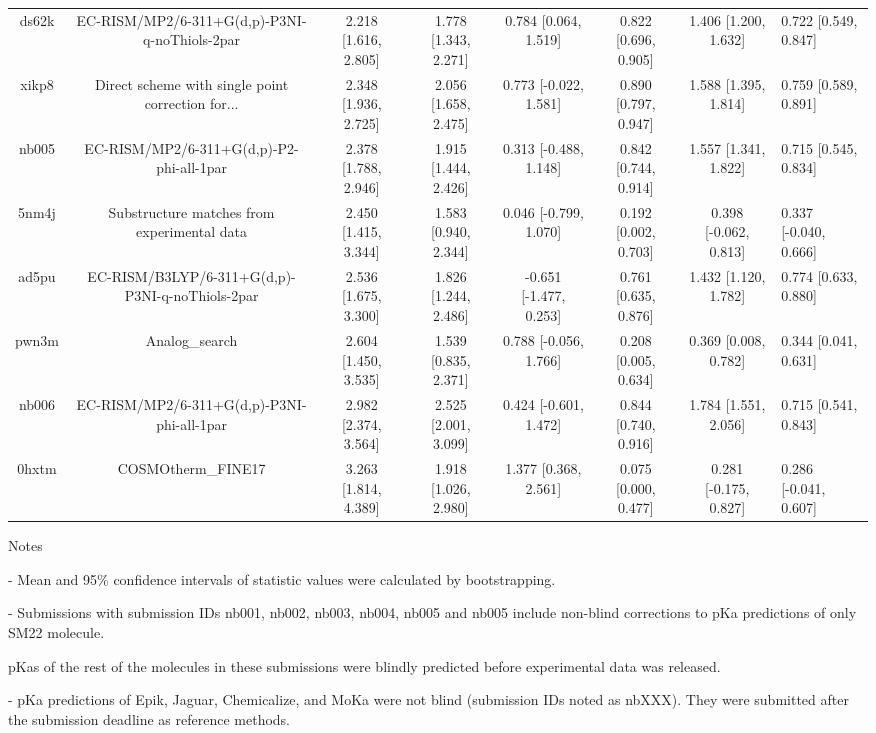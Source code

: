 \documentclass{article}
\begin{document}
\begin{center}
\begin{longtable}{|ccccccc|}
 ds62k &      EC-RISM/MP2/6-311+G(d,p)-P3NI-q-noThiols-2par &  2.218 [1.616, 2.805] &  1.778 [1.343, 2.271] &     0.784 [0.064, 1.519] &  0.822 [0.696, 0.905] &   1.406 [1.200, 1.632] &   0.722 [0.549, 0.847] \\
 xikp8 &  Direct scheme with single point correction for... &  2.348 [1.936, 2.725] &  2.056 [1.658, 2.475] &    0.773 [-0.022, 1.581] &  0.890 [0.797, 0.947] &   1.588 [1.395, 1.814] &   0.759 [0.589, 0.891] \\
 nb005 &           EC-RISM/MP2/6-311+G(d,p)-P2-phi-all-1par &  2.378 [1.788, 2.946] &  1.915 [1.444, 2.426] &    0.313 [-0.488, 1.148] &  0.842 [0.744, 0.914] &   1.557 [1.341, 1.822] &   0.715 [0.545, 0.834] \\
 5nm4j &        Substructure matches from experimental data &  2.450 [1.415, 3.344] &  1.583 [0.940, 2.344] &    0.046 [-0.799, 1.070] &  0.192 [0.002, 0.703] &  0.398 [-0.062, 0.813] &  0.337 [-0.040, 0.666] \\
 ad5pu &    EC-RISM/B3LYP/6-311+G(d,p)-P3NI-q-noThiols-2par &  2.536 [1.675, 3.300] &  1.826 [1.244, 2.486] &   -0.651 [-1.477, 0.253] &  0.761 [0.635, 0.876] &   1.432 [1.120, 1.782] &   0.774 [0.633, 0.880] \\
 pwn3m &                                     Analog\_search &  2.604 [1.450, 3.535] &  1.539 [0.835, 2.371] &    0.788 [-0.056, 1.766] &  0.208 [0.005, 0.634] &   0.369 [0.008, 0.782] &   0.344 [0.041, 0.631] \\
 nb006 &         EC-RISM/MP2/6-311+G(d,p)-P3NI-phi-all-1par &  2.982 [2.374, 3.564] &  2.525 [2.001, 3.099] &    0.424 [-0.601, 1.472] &  0.844 [0.740, 0.916] &   1.784 [1.551, 2.056] &   0.715 [0.541, 0.843] \\
 0hxtm &                                 COSMOtherm\_FINE17 &  3.263 [1.814, 4.389] &  1.918 [1.026, 2.980] &     1.377 [0.368, 2.561] &  0.075 [0.000, 0.477] &  0.281 [-0.175, 0.827] &  0.286 [-0.041, 0.607] \\
\end{longtable}
\end{center}

Notes

- Mean and 95\% confidence intervals of statistic values were calculated by bootstrapping.

- Submissions with submission IDs nb001, nb002, nb003, nb004, nb005 and nb005 include non-blind corrections to pKa predictions of only SM22 molecule.

pKas of the rest of the molecules in these submissions were blindly predicted before experimental data was released.

- pKa predictions of Epik, Jaguar, Chemicalize, and MoKa were not blind (submission IDs noted as nbXXX). They were submitted after the submission deadline as reference methods.
\end{document}
